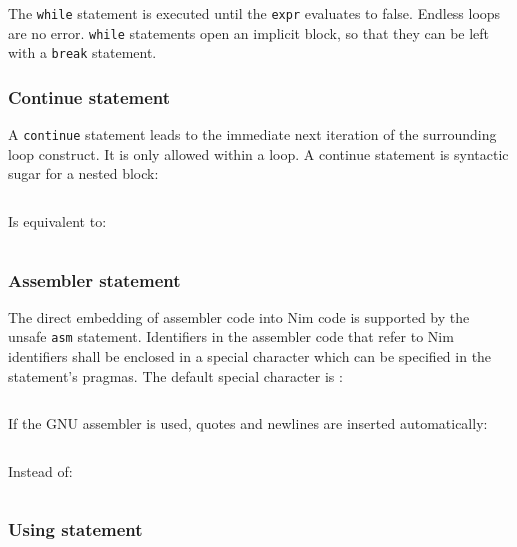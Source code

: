 The \texttt{while} statement is executed until the \texttt{expr}
evaluates to false. Endless loops are no error. \texttt{while}
statements open an {implicit block}, so that they can be left with a
\texttt{break} statement.

\hypertarget{continue-statement}{%
\subsubsection{Continue statement}\label{continue-statement}}

A \texttt{continue} statement leads to the immediate next iteration of
the surrounding loop construct. It is only allowed within a loop. A
continue statement is syntactic sugar for a nested block:

\begin{verbatim}
\end{verbatim}

Is equivalent to:

\begin{verbatim}
\end{verbatim}

\hypertarget{assembler-statement}{%
\subsubsection{Assembler statement}\label{assembler-statement}}

The direct embedding of assembler code into Nim code is supported by the
unsafe \texttt{asm} statement. Identifiers in the assembler code that
refer to Nim identifiers shall be enclosed in a special character which
can be specified in the statement's pragmas. The default special
character is
\texttt{\textquotesingle{}\textasciigrave{}\textquotesingle{}}:

\begin{verbatim}
\end{verbatim}

If the GNU assembler is used, quotes and newlines are inserted
automatically:

\begin{verbatim}
\end{verbatim}

Instead of:

\begin{verbatim}
\end{verbatim}

\hypertarget{using-statement}{%
\subsubsection{Using statement}\label{using-statement}}

